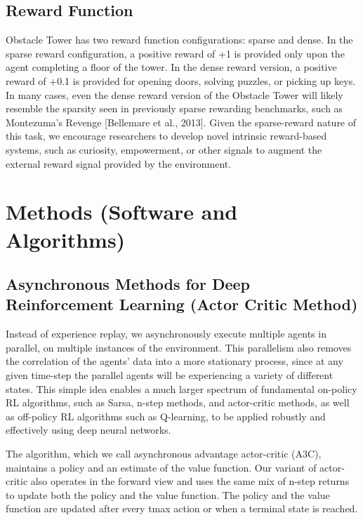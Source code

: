 \documentclass[conference]{IEEEtran}
\begin{document}
\subsection{\textbf{Reward Function}}
Obstacle Tower has two reward function configurations: sparse and dense. In the sparse reward configuration, a positive reward of +1 is provided only upon the agent completing a floor of the tower. In the dense reward version, a positive reward of +0.1 is provided for opening doors, solving puzzles, or picking up keys. In many cases, even the dense reward version of the Obstacle Tower will likely resemble the sparsity seen in previously sparse rewarding benchmarks, such as Montezuma’s Revenge [Bellemare et al., 2013]. Given the sparse-reward nature of this task, we encourage researchers to develop novel intrinsic reward-based systems, such as curiosity, empowerment, or other signals to augment the external reward signal provided by the environment.

\section{Methods (Software and Algorithms)}

\subsection{\textbf{Asynchronous Methods for Deep Reinforcement Learning (Actor Critic Method)}}

Instead of experience replay, we asynchronously execute multiple agents in parallel, on multiple instances of the environment. This parallelism also removes the correlation of the agents’ data into a more stationary process, since at any given time-step the parallel agents will be experiencing a variety of different states. This simple idea enables a much larger spectrum of fundamental on-policy RL algorithms, such as Sarsa, n-step methods, and actor-critic methods, as well as off-policy RL algorithms such as Q-learning, to be applied robustly and effectively using deep neural networks.

The algorithm, which we call asynchronous advantage actor-critic (A3C), maintains a policy and an estimate of the value function. Our variant of actor-critic also operates in the forward view and uses the same mix of n-step returns to update both the policy and the value function. The policy and the value function are updated after every tmax action or when a terminal state is reached.
\end{document}

